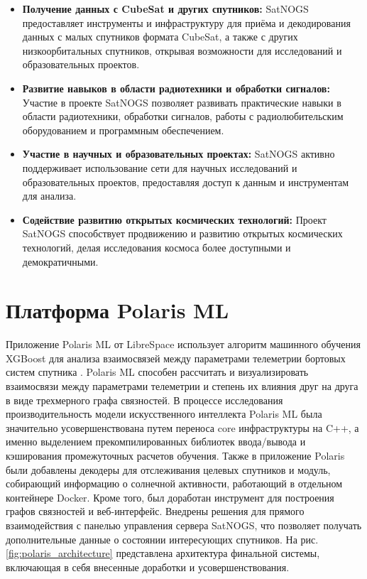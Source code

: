 \documentclass[14pt, a4paper]{extreport}
\begin{document}
    \begin{itemize}
        \item \textbf{Получение данных с CubeSat и других спутников:} SatNOGS предоставляет инструменты и инфраструктуру для приёма и декодирования данных с малых спутников формата CubeSat, а также с других низкоорбитальных спутников,  открывая возможности для исследований и образовательных проектов.
        \item \textbf{Развитие навыков в области радиотехники и обработки сигналов:} Участие в проекте SatNOGS позволяет развивать практические навыки в области радиотехники, обработки сигналов, работы с радиолюбительским оборудованием и программным обеспечением.
        \item \textbf{Участие в научных и образовательных проектах:} SatNOGS активно поддерживает использование сети для научных исследований и образовательных проектов, предоставляя доступ к данным и инструментам для анализа.
        \item \textbf{Содействие развитию открытых космических технологий:} Проект SatNOGS способствует продвижению и развитию открытых космических технологий, делая исследования космоса более доступными и демократичными.
    \end{itemize}

    \newpage


    \section{Платформа Polaris ML}

    Приложение Polaris ML от LibreSpace \cite{librespace_docs} использует алгоритм машинного обучения XGBoost для анализа взаимосвязей между параметрами телеметрии бортовых систем спутника \cite{ray_2002_bayesian}.
    Polaris ML способен рассчитать и визуализировать взаимосвязи между параметрами телеметрии и степень их влияния друг на друга в виде трехмерного графа связностей.
    В процессе исследования производительность модели искусственного интеллекта Polaris ML была значительно усовершенствована путем переноса core инфраструктуры на C++, а именно выделением прекомпилированных библиотек ввода/вывода и кэширования промежуточных расчетов обучения.
    Также в приложение Polaris были добавлены декодеры для отслеживания целевых спутников и модуль, собирающий информацию о солнечной активности, работающий в отдельном контейнере Docker.
    Кроме того, был доработан инструмент для построения графов связностей и веб-интерфейс.
    Внедрены решения для прямого взаимодействия с панелью управления сервера SatNOGS, что позволяет получать дополнительные данные о состоянии интересующих спутников.
    На рис. \ref{fig:polaris_architecture} представлена архитектура финальной системы, включающая в себя внесенные доработки и усовершенствования.
\end{document}
